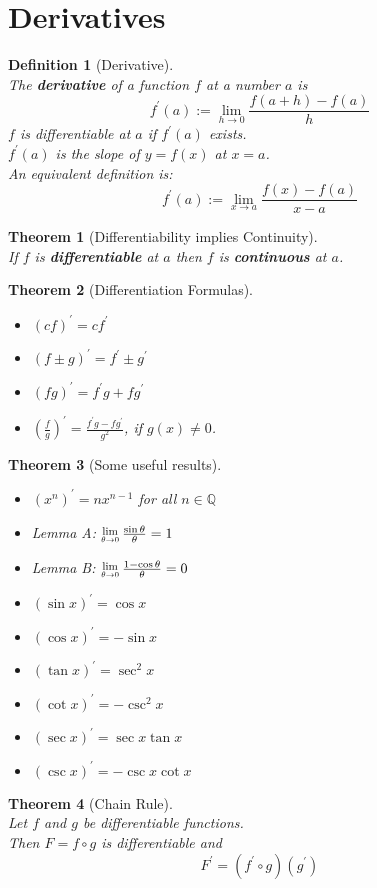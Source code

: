 \documentclass[12pt]{article}
\newcommand{\Lim}[1]{\raisebox{0.5ex}{\scalebox{0.8}{$\displaystyle \lim_{#1}\;$}}}
\newtheorem{definition}{Definition}[section]
\newtheorem{theorem}{Theorem}[section]
\theoremstyle{definition}
\begin{document}
\section{Derivatives}
\begin{definition}[Derivative]
\hfill\\
\normalfont The \textbf{derivative} of a function $f$ at a number $a$ is
\[
f^\prime (a):=\lim_{h\to 0}\frac{f(a+h)-f(a)}{h}
\]
$f$ is differentiable at $a$ if $f^\prime (a)$ exists.\\
$f^\prime (a)$ is the slope of $y=f(x)$ at $x=a$.\\
An equivalent definition is:
\[
f^\prime (a):=\lim_{x\to a}\frac{f(x)-f(a)}{x-a}
\]
\end{definition}
\begin{theorem}[Differentiability implies Continuity]
\hfill\\
\normalfont If $f$ is \textbf{differentiable} at $a$ then $f$ is \textbf{continuous} at $a$.
\end{theorem}
\begin{theorem}[Differentiation Formulas]
\hfill\\
\normalfont
\begin{itemize}
\item $(cf)^\prime=cf^\prime$
\item $(f\pm g)^\prime=f^\prime\pm g^\prime$
\item $(fg)^\prime=f^\prime g + fg^\prime$
\item $\left(\frac{f}{g}\right)^\prime=\frac{f^\prime g -fg^\prime}{g^2}$, if $g(x)\neq 0$.
\end{itemize}
\end{theorem}
\begin{theorem}[Some useful results]
\hfill\\
\normalfont
\begin{itemize}
\item $(x^n)^\prime=nx^{n-1}$ for all $n\in\mathbb{Q}$
\item Lemma A: $\Lim{\theta\to 0}\frac{\sin\theta}{\theta}=1$
\item Lemma B: $\Lim{\theta\to 0}\frac{1-\cos\theta}{\theta}=0$
\item $(\sin x)^\prime = \cos x$
\item $(\cos x)^\prime = -\sin x$
\item $(\tan x)^\prime = \sec^{2}x$
\item $(\cot x)^\prime = -\csc^{2}x$
\item $(\sec x)^\prime = \sec x\tan x$
\item $(\csc x)^\prime = -\csc x\cot x$
\end{itemize}
\end{theorem}
\begin{theorem}[Chain Rule]
\hfill\\
\normalfont Let $f$ and $g$ be differentiable functions.\\
Then $F=f\circ g$ is differentiable and 
\[
F^\prime = (f^\prime \circ g)(g^\prime)
\]
\end{theorem}
\clearpage
\end{document}
